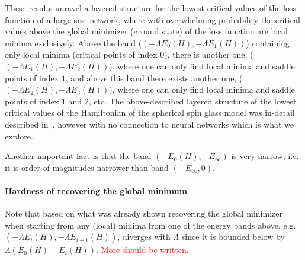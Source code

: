 \documentclass[twoside]{article}
\begin{document}
These results unravel a layered structure for the lowest critical values of the loss function of a large-size network, where with overwhelming probability the critical values above the global minimizer (ground state) of the loss function are local minima exclusively. Above the band ($\left(-\Lambda E_0(H),-\Lambda E_1(H)\right)$) containing only local minima (critical points of index $0$), there is another one, ($\left(-\Lambda E_1(H),-\Lambda E_2(H)\right)$), where one can only find local minima and saddle points of index $1$, and above this band there exists another one, ($\left(-\Lambda E_2(H),-\Lambda E_3(H)\right)$), where one can only find local minima and saddle points of index $1$ and $2$, etc. The above-described layered structure of the lowest critical values of the Hamiltonian of the spherical spin glass model was in-detail described in~\cite{AAC2010}, however with no connection to neural networks which is what we explore. 

Another important fact is that the band $(-E_0(H),-E_{\infty})$ is very narrow, i.e. it is order of magnitudes narrower than band $(-E_{\infty},0)$. 

\paragraph{Hardness of recovering the global minimum}
Note that based on what was already shown recovering the global minimizer when starting from any (local) minima from one of the energy bands above, e.g. $\left(-\Lambda E_i(H),-\Lambda E_{i+1}(H)\right)$, diverges with $\Lambda$ since it is bounded below by $\Lambda (E_0(H) - E_i(H))$. \textcolor{red}{More should be written.}
\end{document}
